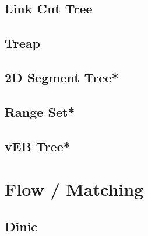 \subsection{Link Cut Tree}

\subsection{Treap}

% 
\subsection{2D Segment Tree*}
% 
% 
\subsection{Range Set*}
\subsection{vEB Tree*}
% 

\section{Flow / Matching}
\subsection{Dinic}

